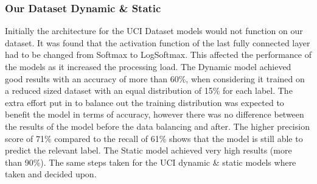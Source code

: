 \subsubsection{Our Dataset Dynamic \& Static}
Initially the architecture for the UCI Dataset models would not function on our dataset.
It was found that the activation function of the last fully connected layer had to be changed from Softmax to LogSoftmax.
This affected the performance of the models as it increased the processing load.
The Dynamic model achieved good results with an accuracy of more than 60\%, when considering it trained on a reduced sized dataset with an equal distribution of 15\% for each label.
The extra effort put in to balance out the training distribution was expected to benefit the model in terms of accuracy, however there was no difference between the results of the model before the data balancing and after.
The higher precision score of 71\% compared to the recall of 61\% shows that the model is still able to predict the relevant label.
The Static model achieved very high results (more than 90\%).
The same steps taken for the UCI dynamic \& static models where taken and decided upon.



